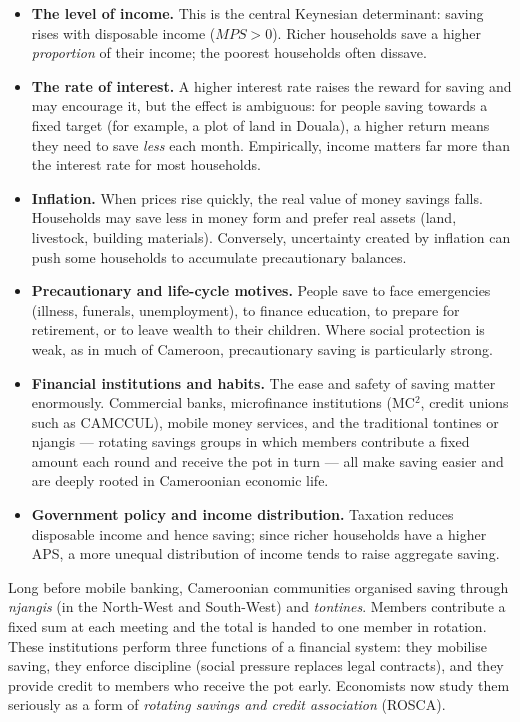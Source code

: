 \documentclass[11pt]{article}
\newcommand{\cle}[1]{{\popxbold\color{popdark}#1}}
\begin{document}
\begin{itemize}
\item \textbf{The level of income.} This is the central Keynesian determinant: saving rises with disposable income ($MPS > 0$). Richer households save a higher \emph{proportion} of their income; the poorest households often dissave.
\item \textbf{The rate of interest.} A higher interest rate raises the reward for saving and may encourage it, but the effect is ambiguous: for people saving towards a fixed target (for example, a plot of land in Douala), a higher return means they need to save \emph{less} each month. Empirically, income matters far more than the interest rate for most households.
\item \textbf{Inflation.} When prices rise quickly, the real value of money savings falls. Households may save less in money form and prefer real assets (land, livestock, building materials). Conversely, uncertainty created by inflation can push some households to accumulate precautionary balances.
\item \textbf{Precautionary and life-cycle motives.} People save to face emergencies (illness, funerals, unemployment), to finance education, to prepare for retirement, or to leave wealth to their children. Where social protection is weak, as in much of Cameroon, precautionary saving is particularly strong.
\item \textbf{Financial institutions and habits.} The ease and safety of saving matter enormously. Commercial banks, microfinance institutions (MC$^2$, credit unions such as CAMCCUL), mobile money services, and the traditional \cle{tontines} or \cle{njangis} — rotating savings groups in which members contribute a fixed amount each round and receive the pot in turn — all make saving easier and are deeply rooted in Cameroonian economic life.
\item \textbf{Government policy and income distribution.} Taxation reduces disposable income and hence saving; since richer households have a higher APS, a more unequal distribution of income tends to raise aggregate saving.
\end{itemize}

\begin{savaistu}
Long before mobile banking, Cameroonian communities organised saving through \emph{njangis} (in the North-West and South-West) and \emph{tontines}. Members contribute a fixed sum at each meeting and the total is handed to one member in rotation. These institutions perform three functions of a financial system: they mobilise saving, they enforce discipline (social pressure replaces legal contracts), and they provide credit to members who receive the pot early. Economists now study them seriously as a form of \emph{rotating savings and credit association} (ROSCA).
\end{savaistu}
\end{document}
